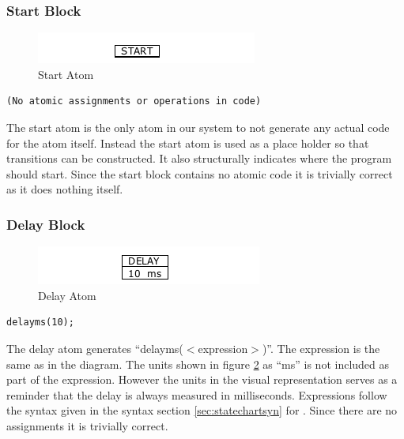 \subsubsection{Start Block}

\begin{figure}[h]
	\centering
	\includegraphics[width=\imgmedphoto]{./images/correctness_atom_start.png}
	\caption{Start Atom}
	\label{fig:correctness_atom_start}
\end{figure}

\begin{lstlisting}[frame=single]
(No atomic assignments or operations in code)
\end{lstlisting}

The start atom is the only atom in our system to not generate any actual code for the atom itself. Instead the start atom is used as a place holder so that transitions can be constructed. It also structurally indicates where the program should start. Since the start block contains no atomic code it is trivially correct as it does nothing itself.


\subsubsection{Delay Block}

\begin{figure}[h]
	\centering
	\includegraphics[width=\imgmedphoto]{./images/correctness_atom_delay.png}
	\caption{Delay Atom}
	\label{fig:correctness_atom_delay}
\end{figure}

\begin{lstlisting}[frame=single]
delayms(10);
\end{lstlisting}

The delay atom generates ``delayms($<$expression$>$)''. The expression is the same as in the diagram. The units shown in figure \ref{fig:correctness_atom_delay} as ``ms'' is not included as part of the expression. However the units in the visual representation serves as a reminder that the delay is always measured in milliseconds. Expressions follow the syntax given in the syntax section \ref{sec:statechartsyn} for \plccharts. Since there are no assignments it is trivially correct.


